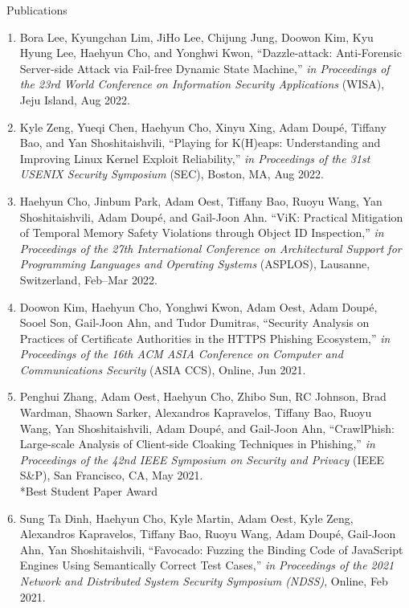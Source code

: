 \documentclass{resume} %
\begin{document}
\begin{rSection}{\faGenderless~Publications}
\begin{enumerate}[leftmargin=0pt]
		\item Bora Lee, Kyungchan Lim, JiHo Lee, Chijung Jung, Doowon Kim, Kyu Hyung Lee, {Haehyun Cho}, and Yonghwi Kwon,
		``Dazzle-attack: Anti-Forensic Server-side Attack via Fail-free Dynamic State Machine,''
		\emph{in Proceedings of the 23rd World Conference on Information Security Applications} (WISA), 
		Jeju Island, Aug 2022.
		
		\item Kyle Zeng, Yueqi Chen, {Haehyun Cho}, Xinyu Xing, Adam Doup\'e, Tiffany Bao, and Yan Shoshitaishvili,
		``Playing for K(H)eaps: Understanding and Improving Linux Kernel Exploit Reliability,'' 
		\emph{in Proceedings of the 31st USENIX Security Symposium} {(SEC)},
		Boston, MA, Aug 2022.

		\item {Haehyun Cho}, Jinbum Park, Adam Oest, Tiffany Bao, Ruoyu Wang, Yan Shoshitaishvili, Adam Doup\'e, and Gail-Joon Ahn.
		``ViK: Practical Mitigation of Temporal Memory Safety Violations through Object ID Inspection,'' 
		\emph{in Proceedings of the 27th International Conference on Architectural Support for Programming Languages and Operating Systems} {(ASPLOS)},
		Lausanne, Switzerland, Feb--Mar 2022.

    	\item Doowon Kim, {Haehyun Cho}, Yonghwi Kwon, Adam Oest, Adam Doup\'e, Sooel Son, Gail-Joon Ahn, and Tudor Dumitras,
    	``Security Analysis on Practices of Certificate Authorities in the HTTPS Phishing Ecosystem,''
    	\emph{in Proceedings of the 16th ACM ASIA Conference on Computer and Communications Security} {(ASIA CCS)},
    	Online, Jun 2021.

    	\item Penghui Zhang, Adam Oest, {Haehyun Cho}, Zhibo Sun, RC Johnson, Brad Wardman, Shaown Sarker, Alexandros Kapravelos, Tiffany Bao, Ruoyu Wang, Yan Shoshitaishvili, Adam Doup\'e, and Gail-Joon Ahn,
    	``CrawlPhish: Large-scale Analysis of Client-side Cloaking Techniques in Phishing,''
        \emph{in Proceedings of the 42nd IEEE Symposium on Security and Privacy} {(IEEE S\&P)},
    	San Francisco, CA, May 2021.\\
        {*}Best Student Paper Award

    	\item Sung Ta Dinh, {Haehyun Cho}, Kyle Martin, Adam Oest, Kyle Zeng, Alexandros Kapravelos, Tiffany Bao, Ruoyu Wang, Adam Doup\'e, Gail-Joon Ahn, Yan Shoshitaishvili,
        ``Favocado: Fuzzing the Binding Code of JavaScript Engines Using Semantically Correct Test Cases,''
        \emph{in Proceedings of the 2021 Network and Distributed System Security Symposium {(NDSS)}},
        Online, Feb 2021.


\end{enumerate}
\end{rSection}
\end{document}
